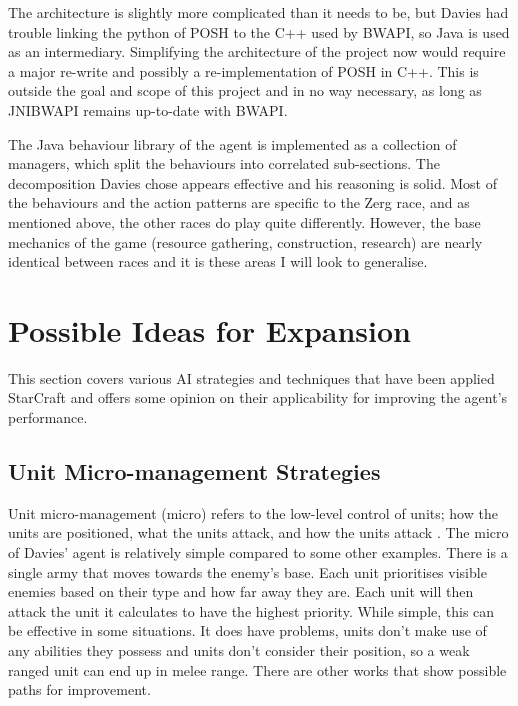 \documentclass[11pt,openright,a4paper]{report}
\begin{document}
The architecture is slightly more complicated than it needs to be, but Davies had trouble linking the python of POSH to the C++ used by BWAPI, so Java is used as an intermediary. Simplifying the architecture of the project now would require a major re-write and possibly a re-implementation of POSH in C++. This is outside the goal and scope of this project and in no way necessary, as long as JNIBWAPI remains up-to-date with BWAPI.

\label{LitSrvyClass}
The Java behaviour library of the agent is implemented as a collection of managers, which split the behaviours into correlated sub-sections. The decomposition Davies chose appears effective and his reasoning is solid.  Most of the behaviours and the action patterns are specific to the Zerg race, and as mentioned above, the other races do play quite differently. However, the base mechanics of the game (resource gathering, construction, research) are nearly identical between races and it is these areas I will look to generalise.

\section{Possible Ideas for Expansion}
This section covers various AI strategies and techniques that have been applied StarCraft and offers some opinion on their applicability for improving the agent's performance.

\subsection{Unit Micro-management Strategies}
\label{LitSrvyMicro}
Unit micro-management (micro) refers to the low-level control of units; how the units are positioned, what the units attack, and how the units attack \cite{TLMicro}.
The micro of Davies' agent is relatively simple compared to some other examples. There is a single army that moves towards the enemy's base. Each unit prioritises visible enemies based on their type and how far away they are. Each unit will then attack the unit it calculates to have the highest priority. While simple, this can be effective in some situations. It does have problems, units don't make use of any abilities they possess and units don't consider their position, so a weak ranged unit can end up in melee range. There are other works that show possible paths for improvement.
\end{document}
